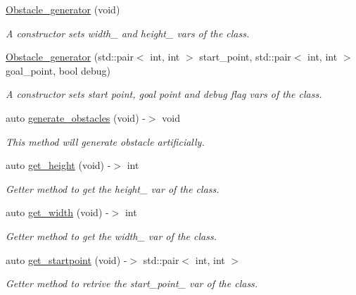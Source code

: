 \begin{DoxyCompactItemize}
\item 
\hyperlink{class_obstacle__generator_ad459071be71de51925d40a8f5c801de1}{Obstacle\+\_\+generator} (void)
\begin{DoxyCompactList}\small\item\em A constructor sets width\+\_\+ and height\+\_\+ vars of the class. \end{DoxyCompactList}\item 
\hyperlink{class_obstacle__generator_a5ab7dc95ba001a8222409fdf1a9ea569}{Obstacle\+\_\+generator} (std\+::pair$<$ int, int $>$ start\+\_\+point, std\+::pair$<$ int, int $>$ goal\+\_\+point, bool debug)
\begin{DoxyCompactList}\small\item\em A constructor sets start point, goal point and debug flag vars of the class. \end{DoxyCompactList}\item 
auto \hyperlink{class_obstacle__generator_a0d6b80b9e69dfe5371abf1ac05bca14a}{generate\+\_\+obstacles} (void) -\/$>$ void
\begin{DoxyCompactList}\small\item\em This method will generate obstacle artificially. \end{DoxyCompactList}\item 
auto \hyperlink{class_obstacle__generator_a07e43157157ba7a26f3fbbc85742d4cb}{get\+\_\+height} (void) -\/$>$ int
\begin{DoxyCompactList}\small\item\em Getter method to get the height\+\_\+ var of the class. \end{DoxyCompactList}\item 
auto \hyperlink{class_obstacle__generator_aaf11b5d507ff8917f732582f406676c4}{get\+\_\+width} (void) -\/$>$ int
\begin{DoxyCompactList}\small\item\em Getter method to get the width\+\_\+ var of the class. \end{DoxyCompactList}\item 
auto \hyperlink{class_obstacle__generator_a5bcf25ad3d23e51d7023c948f227c03d}{get\+\_\+startpoint} (void) -\/$>$ std\+::pair$<$ int, int $>$
\begin{DoxyCompactList}\small\item\em Getter method to retrive the start\+\_\+point\+\_\+ var of the class. \end{DoxyCompactList}\item 

\end{DoxyCompactItemize}
